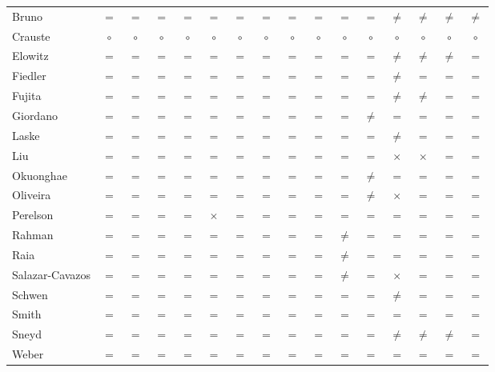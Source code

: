 {\begin{longtable}{@{}lccccccccccccccc@{}}
Bruno & $=$ & $=$ & $=$ & $=$ & $=$ & $=$ & $=$ & $=$ & $=$ & $=$ & $=$ & $\neq$ & $\neq$ & $\neq$ & $\neq$ \\
Crauste & $\circ$ & $\circ$ & $\circ$ & $\circ$ & $\circ$ & $\circ$ & $\circ$ & $\circ$ & $\circ$ & $\circ$ & $\circ$ & $\circ$ & $\circ$ & $\circ$ & $\circ$ \\
Elowitz & $=$ & $=$ & $=$ & $=$ & $=$ & $=$ & $=$ & $=$ & $=$ & $=$ & $=$ & $\neq$ & $\neq$ & $\neq$ & $=$ \\
Fiedler & $=$ & $=$ & $=$ & $=$ & $=$ & $=$ & $=$ & $=$ & $=$ & $=$ & $=$ & $\neq$ & $=$ & $=$ & $=$ \\
Fujita & $=$ & $=$ & $=$ & $=$ & $=$ & $=$ & $=$ & $=$ & $=$ & $=$ & $=$ & $\neq$ & $\neq$ & $=$ & $=$ \\
Giordano & $=$ & $=$ & $=$ & $=$ & $=$ & $=$ & $=$ & $=$ & $=$ & $=$ & $\neq$ & $=$ & $=$ & $=$ & $=$ \\
Laske & $=$ & $=$ & $=$ & $=$ & $=$ & $=$ & $=$ & $=$ & $=$ & $=$ & $=$ & $\neq$ & $=$ & $=$ & $=$ \\
Liu & $=$ & $=$ & $=$ & $=$ & $=$ & $=$ & $=$ & $=$ & $=$ & $=$ & $=$ & $\times$ & $\times$ & $=$ & $=$ \\
Okuonghae & $=$ & $=$ & $=$ & $=$ & $=$ & $=$ & $=$ & $=$ & $=$ & $=$ & $\neq$ & $=$ & $=$ & $=$ & $=$ \\
Oliveira & $=$ & $=$ & $=$ & $=$ & $=$ & $=$ & $=$ & $=$ & $=$ & $=$ & $\neq$ & $\times$ & $=$ & $=$ & $=$ \\
Perelson & $=$ & $=$ & $=$ & $=$ & $\times$ & $=$ & $=$ & $=$ & $=$ & $=$ & $=$ & $=$ & $=$ & $=$ & $=$ \\
Rahman & $=$ & $=$ & $=$ & $=$ & $=$ & $=$ & $=$ & $=$ & $=$ & $\neq$ & $=$ & $=$ & $=$ & $=$ & $=$ \\
Raia & $=$ & $=$ & $=$ & $=$ & $=$ & $=$ & $=$ & $=$ & $=$ & $\neq$ & $=$ & $=$ & $=$ & $=$ & $=$ \\
Salazar-Cavazos & $=$ & $=$ & $=$ & $=$ & $=$ & $=$ & $=$ & $=$ & $=$ & $\neq$ & $=$ & $\times$ & $=$ & $=$ & $=$ \\
Schwen & $=$ & $=$ & $=$ & $=$ & $=$ & $=$ & $=$ & $=$ & $=$ & $=$ & $=$ & $\neq$ & $=$ & $=$ & $=$ \\
Smith & $=$ & $=$ & $=$ & $=$ & $=$ & $=$ & $=$ & $=$ & $=$ & $=$ & $=$ & $=$ & $=$ & $=$ & $=$ \\
Sneyd & $=$ & $=$ & $=$ & $=$ & $=$ & $=$ & $=$ & $=$ & $=$ & $=$ & $=$ & $\neq$ & $\neq$ & $\neq$ & $=$ \\
Weber & $=$ & $=$ & $=$ & $=$ & $=$ & $=$ & $=$ & $=$ & $=$ & $=$ & $=$ & $=$ & $=$ & $=$ & $=$ \\

\end{longtable}}
